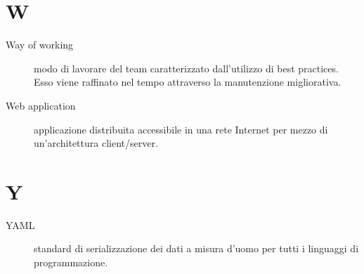 \documentclass{article}
\begin{document}
\section{W}
\begin{description}
  \item[Way of working] modo di lavorare del team caratterizzato dall'utilizzo di best practices. Esso viene raffinato nel tempo attraverso la manutenzione migliorativa.
  \item[Web application] applicazione distribuita accessibile in una rete Internet per mezzo di un'architettura client/server.
\end{description}
\newpage
\section{Y}
\begin{description}
  \item[YAML] standard di serializzazione dei dati a misura d'uomo per tutti i linguaggi di programmazione.
\end{description}
\newpage
\end{document}
